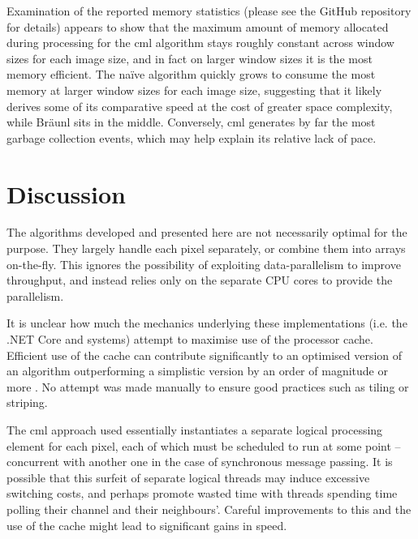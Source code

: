 Examination of the reported memory statistics (please see the GitHub repository for details) appears to show that the maximum amount of memory allocated during processing for the \gls{cml} algorithm stays roughly constant across window sizes for each image size, and in fact on larger window sizes it is the most memory efficient.  The naïve algorithm quickly grows to consume the most memory at larger window sizes for each image size, suggesting that it likely derives some of its comparative speed at the cost of greater space complexity, while Bräunl sits in the middle.  Conversely, \gls{cml} generates by far the most garbage collection events, which may help explain its relative lack of pace.

\section{Discussion}

The algorithms developed and presented here are not necessarily optimal for the purpose.  They largely handle each pixel separately, or combine them into arrays on-the-fly.  This ignores the possibility of exploiting data-parallelism to improve throughput, and instead relies only on the separate CPU cores to provide the parallelism.

It is unclear how much the mechanics underlying these implementations (i.e. the .NET Core and \hopac{} systems) attempt to maximise use of the processor cache.  Efficient use of the cache can contribute significantly to an optimised version of an algorithm outperforming a simplistic version by an order of magnitude or more \cite{Ragan-Kelley2017}.  No attempt was made manually to ensure good practices such as tiling or striping.  %

The \gls{cml} approach used essentially instantiates a separate logical processing element for each pixel, each of which must be scheduled to run at some point -- concurrent with another one in the case of synchronous message passing.  It is possible that this surfeit of separate logical threads may induce excessive switching costs, and perhaps promote wasted time with threads spending time polling their channel and their neighbours'.  Careful improvements to this and the use of the cache might lead to significant gains in speed.

